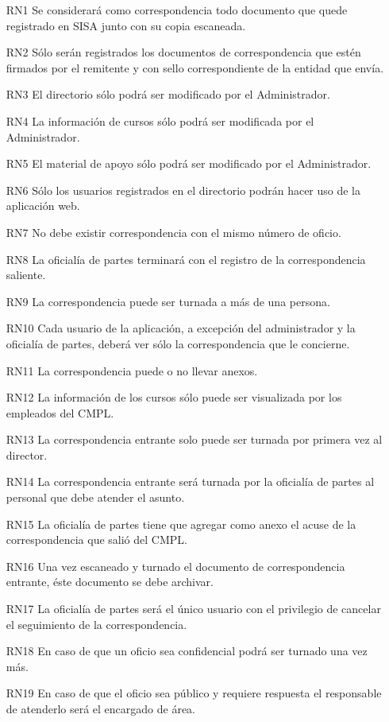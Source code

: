 \begin{enumerate}
	\item[RN1] Se considerará como correspondencia todo documento que quede registrado en SISA junto con su copia escaneada.
	\item[RN2] Sólo serán registrados los documentos de correspondencia que estén firmados por el remitente y con sello correspondiente de la entidad que envía.
	\item[RN3] El directorio sólo podrá ser modificado por el Administrador.
	\item[RN4] La información de cursos sólo podrá ser modificada por el Administrador.
	\item[RN5] El material de apoyo sólo podrá ser modificado por el Administrador.
	\item[RN6] Sólo los usuarios registrados en el directorio podrán hacer uso de la aplicación web.
	\item[RN7] No debe existir correspondencia con el mismo número de oficio.
	\item[RN8] La oficialía de partes terminará con el registro de la correspondencia saliente.
	\item[RN9] La correspondencia puede ser turnada a más de una persona.
	\item[RN10] Cada usuario de la aplicación, a excepción del administrador y la oficialía de partes,
deberá ver sólo la correspondencia que le concierne.
	\item[RN11] La correspondencia puede o no llevar anexos.
	\item[RN12] La información de los cursos sólo puede ser visualizada por los empleados del CMPL.
	\item[RN13] La correspondencia entrante solo puede ser turnada por primera vez al director.
	\item[RN14] La correspondencia entrante será turnada por la oficialía de partes al personal que debe
atender el asunto.
	\item[RN15] La oficialía de partes tiene que agregar como anexo el acuse de la correspondencia que
salió del CMPL.
	\item[RN16] Una vez escaneado y turnado el documento de correspondencia entrante, éste documento
se debe archivar.
	\item[RN17] La oficialía de partes será el único usuario con el privilegio de cancelar el seguimiento
de la correspondencia.
	\item[RN18] En caso de que un oficio sea confidencial podrá ser turnado una vez más.
	\item[RN19] En caso de que el oficio sea público y requiere respuesta el responsable de atenderlo será el encargado de área.
\end{enumerate}

